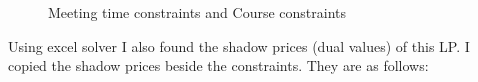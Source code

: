 \documentclass[paper=letter, fontsize=11pt]{scrartcl} %
\begin{document}
\begin{figure}[H]
  
  \centering
    \caption{Meeting time constraints and Course constraints}
\end{figure}

Using excel solver I also found the shadow prices (dual values) of this LP. I copied the shadow prices beside the constraints. They are as follows:
\end{document}

